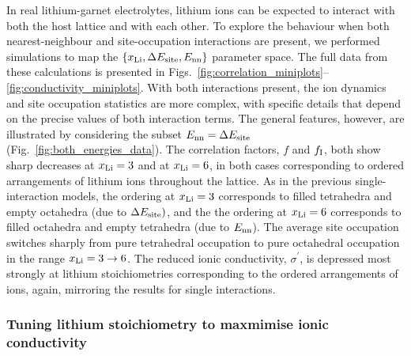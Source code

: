 \documentclass[aps,prb,twocolumn,superscriptaddress,reprint]{revtex4-1}
\newcommand{\xLi}{x_\m{Li}}
\begin{document}
In real lithium-garnet electrolytes, lithium ions can be expected to interact with both the host lattice and with each other. To explore the behaviour when both nearest-neighbour and site-occupation interactions are present, we performed simulations to map the $\left\{\xLi, \Delta E_\m{site}, E_\m{nn}\right\}$ parameter space. 
The full data from these calculations is presented in Figs.~\ref{fig:correlation_miniplots}--\ref{fig:conductivity_miniplots}. With both interactions present, the ion dynamics and site occupation statistics are  more complex, with specific details that depend on the precise values of both interaction terms. The general features, however, are illustrated by considering the subset $E_{\mathrm{nn}}=\Delta E_{\mathrm{site}}$ (Fig.~\ref{fig:both_energies_data}). The correlation factors, $f$ and $f_{\mathrm{I}}$, both show sharp decreases at $\xLi=3$ and at $\xLi=6$, in both cases corresponding to ordered arrangements of lithium ions throughout the lattice. As in the previous single-interaction models, the ordering at $\xLi=3$ corresponds to filled tetrahedra and empty octahedra (due to $\Delta E_{\mathrm{site}})$, and the the ordering at $\xLi=6$ corresponds to filled octahedra and empty tetrahedra (due to $E_{\mathrm{nn}}$). The average site occupation switches sharply from pure tetrahedral occupation to pure octahedral occupation in the range $\xLi=3\to6$. The reduced ionic conductivity, $\sigma^\prime$, is depressed most strongly at lithium stoichiometries corresponding to the ordered arrangements of ions, again, mirroring the results for single interactions. 

\subsubsection{Tuning lithium stoichiometry to maxmimise ionic conductivity}
\end{document}
